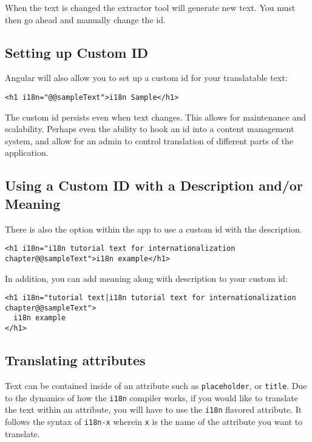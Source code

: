 When the text is changed the extractor tool will generate new text. You must then go ahead and manually change the id. 

\subsection{Setting up Custom ID}
Angular will also allow you to set up a custom id for your translatable text:
\begin{lstlisting}
<h1 i18n="@@sampleText">i18n Sample</h1>
\end{lstlisting}

The custom id persists even when text changes. This allows for maintenance and scalability. Perhaps even the ability to hook an id into a content management system, and allow for an admin to control translation of different parts of the application. 

\subsection{Using a Custom ID with a Description and/or Meaning}
There is also the option within the app to use a custom id with the description. 
\begin{lstlisting}[caption=custom id with description]
<h1 i18n="i18n tutorial text for internationalization chapter@@sampleText">i18n example</h1>
\end{lstlisting}

In addition, you can add meaning along with description to your custom id:
\begin{lstlisting}[caption=custom id with meaning and description]
<h1 i18n="tutorial text|i18n tutorial text for internationalization chapter@@sampleText">
  i18n example
</h1>
\end{lstlisting}


\subsection{Translating attributes}
Text can be contained inside of an attribute such as \lstinline{placeholder}, or \lstinline{title}. Due to the dynamics of how the \lstinline{i18n} compiler works, if you would like to translate the text within an attribute, you will have to use the \lstinline{i18n} flavored attribute. It follows the syntax of 
\lstinline{i18n-x} wherein \lstinline{x} is the name of the attribute you want to translate. 

